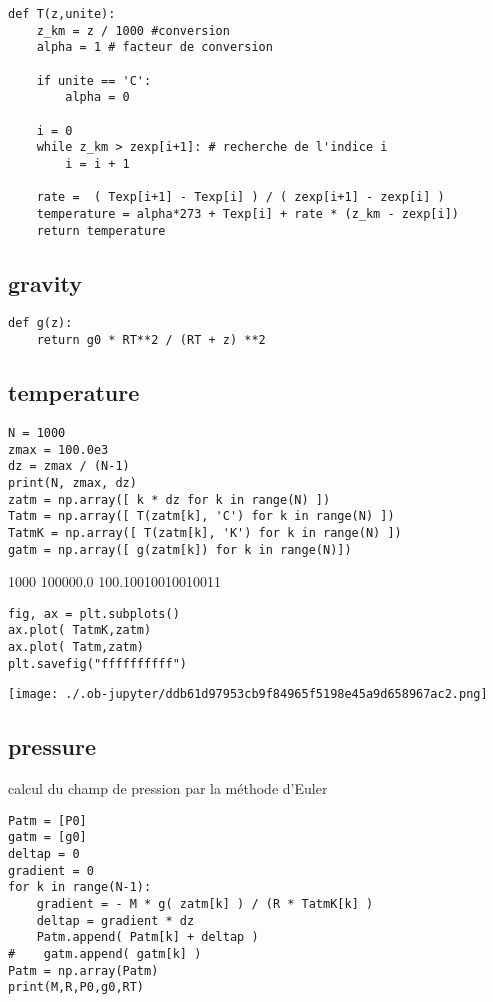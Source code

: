 \documentclass[11pt]{article}
\begin{document}
\begin{verbatim}
def T(z,unite):
    z_km = z / 1000 #conversion
    alpha = 1 # facteur de conversion
    
    if unite == 'C':
        alpha = 0
        
    i = 0
    while z_km > zexp[i+1]: # recherche de l'indice i
        i = i + 1
        
    rate =  ( Texp[i+1] - Texp[i] ) / ( zexp[i+1] - zexp[i] )
    temperature = alpha*273 + Texp[i] + rate * (z_km - zexp[i])
    return temperature

\end{verbatim}


\subsection{gravity}
\label{sec:orge117953}
\begin{verbatim}
def g(z):
    return g0 * RT**2 / (RT + z) **2
\end{verbatim}


\subsection{temperature}
\label{sec:orgad2f3cd}
\begin{verbatim}
N = 1000
zmax = 100.0e3
dz = zmax / (N-1)
print(N, zmax, dz)
zatm = np.array([ k * dz for k in range(N) ])
Tatm = np.array([ T(zatm[k], 'C') for k in range(N) ])
TatmK = np.array([ T(zatm[k], 'K') for k in range(N) ])
gatm = np.array([ g(zatm[k]) for k in range(N)])
\end{verbatim}

1000 100000.0 100.10010010010011

\begin{verbatim}
fig, ax = plt.subplots()
ax.plot( TatmK,zatm)
ax.plot( Tatm,zatm)
plt.savefig("ffffffffff")
\end{verbatim}


\begin{center}
\texttt{[image: ./.ob-jupyter/ddb61d97953cb9f84965f5198e45a9d658967ac2.png]}
\end{center}


\subsection{pressure}
\label{sec:org6b0ed68}
calcul du champ de pression par la méthode d'Euler
\begin{verbatim}
Patm = [P0]
gatm = [g0]
deltap = 0
gradient = 0
for k in range(N-1):
    gradient = - M * g( zatm[k] ) / (R * TatmK[k] )
    deltap = gradient * dz
    Patm.append( Patm[k] + deltap )
#    gatm.append( gatm[k] )
Patm = np.array(Patm)
print(M,R,P0,g0,RT)
\end{verbatim}
\end{document}

